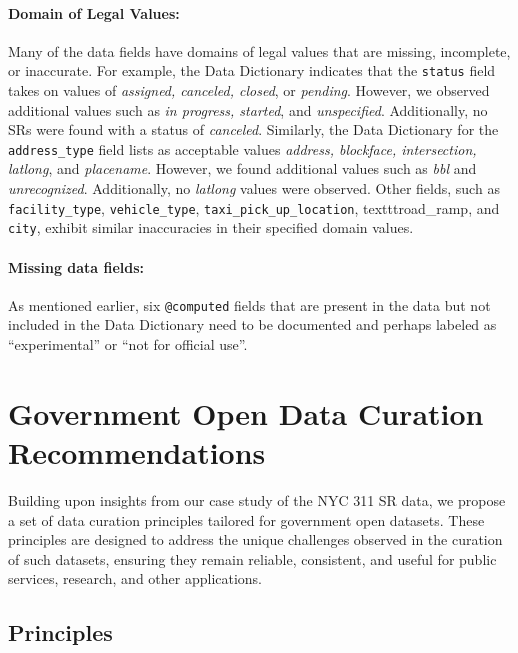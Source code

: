 \documentclass[linenumber]{jdsart}
\begin{document}
\paragraph{Domain of Legal Values:} Many of the data fields have
domains of legal values that are missing, incomplete, or inaccurate. For 
example, the Data Dictionary indicates 
that the \texttt{status} field takes on values of \textit{assigned, canceled, 
closed}, or \textit{pending}. However, we observed additional values 
such as \textit{in progress, started}, and \textit{unspecified}. Additionally, 
no SRs were found with a status of \textit{canceled}. Similarly, 
the Data Dictionary for the \texttt{address\_type} field lists as acceptable
values \textit{address, blockface, intersection, latlong}, and 
\textit{placename}. However, we found additional values such 
as \textit{bbl} and \textit{unrecognized}. Additionally, no 
\textit{latlong} values were observed. Other fields, such 
as \texttt{facility\_type}, \texttt{vehicle\_type}, \texttt{taxi\_pick\_up\_location},
texttt{road\_ramp}, and \texttt{city}, exhibit similar inaccuracies 
in their specified domain values.

\paragraph{Missing data fields:} As mentioned earlier, six \texttt{@computed} 
fields that are present in the data but not included in 
the Data Dictionary need to be documented and perhaps 
labeled as ``experimental'' or ``not for official use''.


\section{Government Open Data Curation Recommendations}
\label{sec:recommendations}
Building upon  insights from our case study of the 
NYC 311 SR data, we propose a set of data 
curation principles tailored for government open datasets. 
These principles are designed to address the unique challenges 
 observed in the curation of such datasets, 
ensuring they remain reliable, consistent, and useful for 
public services, research, and other applications.

\subsection{Principles}
\end{document}
